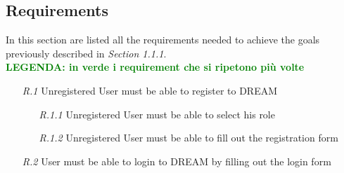 \subsection{Requirements}

In this section are listed all the requirements needed to achieve the goals previously described in \textit{Section 1.1.1}.\\

\textbf{\textcolor{green}{LEGENDA: in verde i requirement che si ripetono più volte}}

\begin{itemize}
     \item [\textit{R.1}] Unregistered User must be able to register to DREAM
    \begin{itemize}
        \item [\textit{R.1.1}] Unregistered User must be able to select his role
        \item [\textit{R.1.2}] Unregistered User must be able to fill out the registration form
    \end{itemize}
    \item [\textit{R.2}] User must be able to login to DREAM by filling out the login form


\end{itemize}

